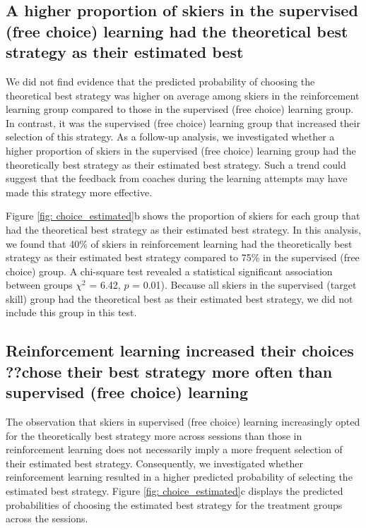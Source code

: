 \documentclass[pdflatex,sn-mathphys-num]{sn-jnl}%
\theoremstyle{thmstyleone}%
\theoremstyle{thmstyletwo}%
\theoremstyle{thmstylethree}%
\begin{document}
\subsection{A higher proportion of skiers in the supervised (free choice) learning had the theoretical best strategy as their estimated best}\label{subsubsec3}
We did not find evidence that the predicted probability of choosing the theoretical best strategy was higher on average among skiers in the reinforcement learning group compared to those in the supervised (free choice) learning group. In contrast, it was the supervised (free choice) learning group that increased their selection of this strategy. As a follow-up analysis, we investigated whether a higher proportion of skiers in the supervised (free choice) learning group had the theoretically best strategy as their estimated best strategy. Such a trend could suggest that the feedback from coaches during the learning attempts may have made this strategy more effective. 

Figure \ref{fig: choice_estimated}b shows the proportion of skiers for each group that had the theoretical best strategy as their estimated best strategy. In this analysis, we found that 40\% of skiers in reinforcement learning had the theoretically best strategy as their estimated best strategy compared to 75\% in the supervised (free choice) group. A chi-square test revealed a statistical significant association between groups $\chi^2$ = 6.42, $p$ = 0.01). Because all skiers in the supervised (target skill) group had the theoretical best as their estimated best strategy, we did not include this group in this test.  


\subsection{Reinforcement learning increased their choices ??chose their best strategy more often than supervised (free choice) learning}\label{subsubsec3}
The observation that skiers in supervised (free choice) learning increasingly opted for the theoretically best strategy more across sessions than those in reinforcement learning does not necessarily imply a more frequent selection of their estimated best strategy. Consequently, we investigated whether reinforcement learning resulted in a higher predicted probability of selecting the estimated best strategy. Figure \ref{fig: choice_estimated}c displays the predicted probabilities of choosing the estimated best strategy for the treatment groups across the sessions. 
\end{document}
